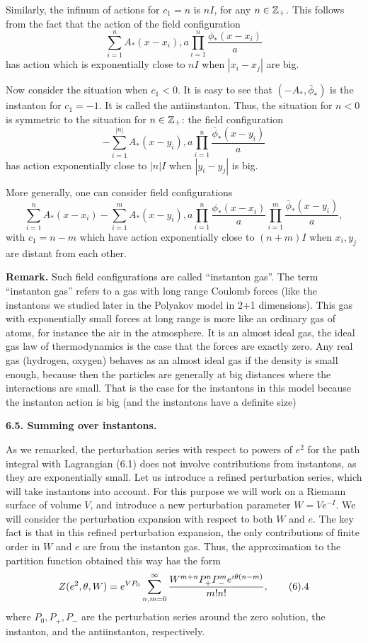 Similarly, the infinum of actions for $c_1=n$ is $nI$, for any
$n\in \Bbb Z_+$. This follows from the fact that the action of 
the field configuration 
$$\sum_{i=1}^n A_*(x-x_i), a\prod_{i=1}^n\frac{\phi_*(x-x_i)}{a}$$
has action which is exponentially close to $nI$ when $|x_i-x_j|$ are big. 

Now consider the situation when $c_1<0$. It is easy to see that 
$(-A_*,\bar \phi_*)$ is the instanton for $c_1=-1$. 
It is called the antiinstanton. Thus, 
the situation for $n<0$ is symmetric to the situation for $n\in \Bbb Z_+$:
the field configuration $$-\sum_{i=1}^{|n|}A_*(x-y_i),
a\prod_{i=1}^n\frac{\bar\phi_*(x-y_i)}{a}$$ has action exponentially
close to $|n|I$ when $|y_i-y_j|$ is big. 

More generally, one can consider field configurations
$$\sum_{i=1}^n A_*(x-x_i)-\sum_{i=1}^m A_*(x-y_i),
a\prod_{i=1}^n\frac{\phi_*(x-x_i)}{a}
\prod_{i=1}^m\frac{\bar\phi_*(x-y_i)}{a},$$ 
with $c_1=n-m$ which have action exponentially 
close to $(n+m)I$ when $x_i,y_j$ are distant from each other. 

{\bf Remark.} 
Such field configurations are called ``instanton gas''. 
The term ``instanton gas'' refers to a gas with long range
Coulomb forces (like the instantons we studied later in the Polyakov
model in 2+1 dimensions).  This gas with exponentially small forces
at long range is more like an ordinary gas of atoms, for instance
the air in the atmosphere.  It is an almost ideal gas, the ideal gas law
of thermodynamics is the case that the forces are exactly zero.  Any
real gas (hydrogen, oxygen) behaves as an almost ideal gas if the density
is small enough, because then the particles are generally at big distances
where the interactions are small.  That is the case for the instantons
in this model because the instanton action is big (and the instantons
have a definite size)

{\bf 6.5. Summing over instantons.}

As we remarked, the perturbation series with respect to powers of $e^2$
for the path integral with Lagrangian (6.1) does not involve contributions
from instantons, as they are exponentially small. Let us introduce 
a refined perturbation series, which will take instantons into account. 
For this purpose we will work on a Riemann surface of volume $V$, and 
introduce a new perturbation parameter $W=Ve^{-I}$.
We will consider the perturbation expansion with respect to both $W$ and $e$. 
The key fact is that in this
refined perturbation expansion, the only contributions of finite order
in $W$ and $e$ are from the instanton gas. Thus, the approximation 
to the partition function obtained this way has the form
$$
Z(e^2,\theta,W)=e^{VP_0}\sum_{n,m=0}^{\infty}
\frac{W^{m+n}P_+^nP_-^me^{i\theta(n-m)}}{m!n!},\tag 6.4
$$
where $P_0,P_+,P_-$ are the perturbation series around the zero
solution, the instanton, and the antiinstanton, respectively. 

